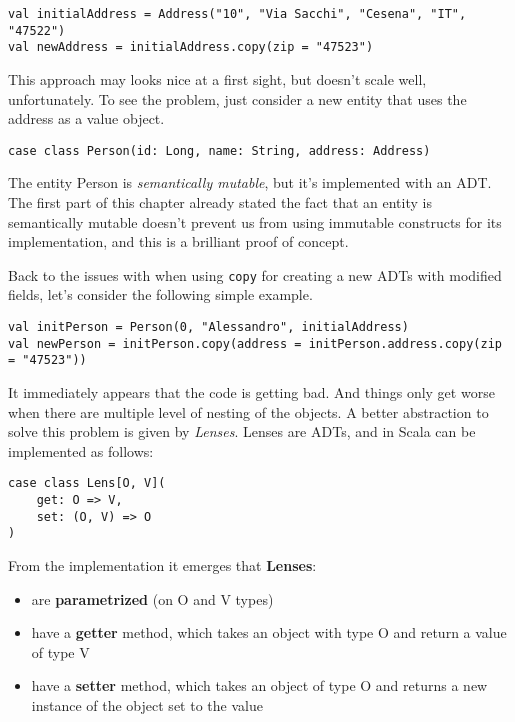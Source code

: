 \begin{verbatim}
val initialAddress = Address("10", "Via Sacchi", "Cesena", "IT", "47522")
val newAddress = initialAddress.copy(zip = "47523")
\end{verbatim}

This approach may looks nice at a first sight, but doesn't scale well,
unfortunately. To see the problem, just consider a new entity that uses
the address as a value object.

\begin{verbatim}
case class Person(id: Long, name: String, address: Address)
\end{verbatim}

The entity Person is \emph{semantically mutable}, but it's implemented
with an ADT. The first part of this chapter already stated the fact that
an entity is semantically mutable doesn't prevent us from using
immutable constructs for its implementation, and this is a brilliant
proof of concept.

Back to the issues with when using \texttt{copy} for creating a new ADTs
with modified fields, let's consider the following simple example.

\begin{verbatim}
val initPerson = Person(0, "Alessandro", initialAddress)
val newPerson = initPerson.copy(address = initPerson.address.copy(zip = "47523"))
\end{verbatim}

It immediately appears that the code is getting bad. And things only get
worse when there are multiple level of nesting of the objects. A better
abstraction to solve this problem is given by \emph{Lenses}. Lenses are
ADTs, and in Scala can be implemented as follows:

\begin{verbatim}
case class Lens[O, V](
    get: O => V,
    set: (O, V) => O
)
\end{verbatim}

From the implementation it emerges that \textbf{Lenses}:

\begin{itemize}
\itemsep1pt\parskip0pt
\item
  are \textbf{parametrized} (on O and V types)
\item
  have a \textbf{getter} method, which takes an object with type O and
  return a value of type V
\item
  have a \textbf{setter} method, which takes an object of type O and
  returns a new instance of the object set to the value
\end{itemize}


